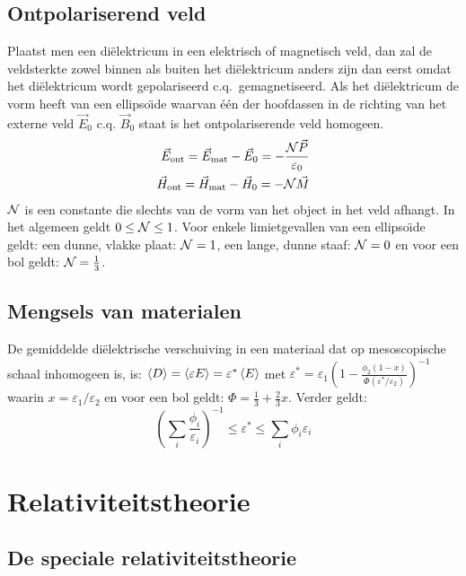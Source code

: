 \documentclass[twoside]{report}
\begin{document}
\section{Ontpolariserend veld}
Plaatst men een di\"elektricum in een elektrisch of magnetisch veld, dan zal
de veldsterkte zowel binnen als buiten het di\"elektricum anders zijn dan
eerst omdat het di\"elektricum wordt gepolariseerd c.q.\ gemagnetiseerd. Als
het di\"elektricum de vorm heeft van een ellipso\"{\i}de waarvan \'e\'en der
hoofdassen in de richting van het externe veld $\vec{E}_0$ c.q. $\vec{B}_0$
staat is het ontpolariserende veld homogeen.
\begin{eqnarray*}
\vec{E}_{\rm ont}=\vec{E}_{\rm mat}-\vec{E}_0=-\frac{{\cal N}\vec{P}}{\varepsilon_0}\\
\vec{H}_{\rm ont}=\vec{H}_{\rm mat}-\vec{H}_0=-{\cal N}\vec{M}
\end{eqnarray*}
$\cal N$ is een constante die slechts van de vorm van het object in het veld
afhangt. In het algemeen geldt $0\leq{\cal N}\leq1$. Voor enkele
limietgevallen van een ellipso\"{\i}de geldt: een dunne, vlakke plaat:
${\cal N}=1$, een lange, dunne staaf: ${\cal N}=0$ en voor een bol geldt:
${\cal N}=\frac{1}{3}$.

\section{Mengsels van materialen}
De gemiddelde di\"elektrische verschuiving in een materiaal dat op mesoscopische
schaal inhomogeen is, is: $\left\langle D \right\rangle=\left\langle \varepsilon E \right\rangle=\varepsilon^*\left\langle E \right\rangle$ met
$\displaystyle \varepsilon^*=\varepsilon_1\left(1-\frac{\phi_2(1-x)}{\Phi(\varepsilon^*/\varepsilon_2)}\right)^{-1}$
waarin $x=\varepsilon_1/\varepsilon_2$ en voor een bol geldt:
$\Phi=\frac{1}{3}+\frac{2}{3}x$. Verder geldt:
\[
\left(\sum_i \frac{\phi_i}{\varepsilon_i}\right)^{-1}\leq\varepsilon^*\leq\sum_i \phi_i\varepsilon_i
\]

\chapter{Relativiteitstheorie}
\section{De speciale relativiteitstheorie}
\end{document}

